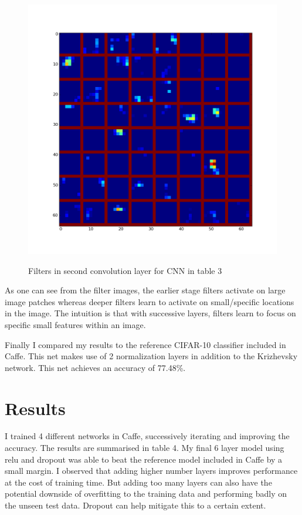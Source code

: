 \documentclass[10pt,twocolumn,letterpaper]{article}
\begin{document}
\begin{figure}[hbt]

  \centering
  \includegraphics[scale=0.32]{d3.png}
  \label{l3}
  \caption{Filters in second convolution layer for CNN in table 3}
\end{figure}

As one can see from the filter images, the earlier stage filters activate on large image patches whereas deeper filters learn to activate on small/specific locations in the image. The intuition is that with successive layers, filters learn to focus on specific small features within an image.

Finally I compared my results to the reference CIFAR-10 classifier included in Caffe. This net makes use of 2 normalization layers in addition to the Krizhevsky network. This net achieves an accuracy of 77.48\%.

\section{Results}

I trained 4 different networks in Caffe, successively iterating and improving the accuracy. The results are summarised in table 4. My final 6 layer model using relu and dropout was able to beat the reference model included in Caffe by a small margin. I observed that adding higher number layers improves performance at the cost of training time. But adding too many layers can also have the potential downside of overfitting to the training data and performing badly on the unseen test data. Dropout can help mitigate this to a certain extent.
\end{document}
